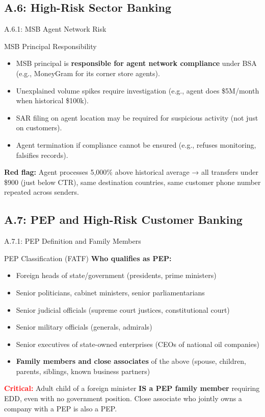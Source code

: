 \documentclass{beamer}
\begin{document}
	\subsection{A.6: High-Risk Sector Banking}
	
	\begin{frame}{A.6.1: MSB Agent Network Risk}
		\begin{block}{MSB Principal Responsibility}
			\begin{itemize}
				\item MSB principal is \textbf{responsible for agent network compliance} under BSA (e.g., MoneyGram for its corner store agents).
				\item Unexplained volume spikes require investigation (e.g., agent does \$5M/month when historical \$100k).
				\item SAR filing on agent location may be required for suspicious activity (not just on customers).
				\item Agent termination if compliance cannot be ensured (e.g., refuses monitoring, falsifies records).
			\end{itemize}
		\end{block}
		\textbf{Red flag:} Agent processes 5,000\% above historical average → all transfers under \$900 (just below CTR), same destination countries, same customer phone number repeated across senders.
	\end{frame}
	
	\subsection{A.7: PEP and High-Risk Customer Banking}
	
	\begin{frame}{A.7.1: PEP Definition and Family Members}
		\begin{block}{PEP Classification (FATF)}
			\textbf{Who qualifies as PEP:}
			\begin{itemize}
				\item Foreign heads of state/government (presidents, prime ministers)
				\item Senior politicians, cabinet ministers, senior parliamentarians
				\item Senior judicial officials (supreme court justices, constitutional court)
				\item Senior military officials (generals, admirals)
				\item Senior executives of state-owned enterprises (CEOs of national oil companies)
				\item \textbf{Family members and close associates} of the above (spouse, children, parents, siblings, known business partners)
			\end{itemize}
		\end{block}
		\textcolor{red}{\textbf{Critical:}} Adult child of a foreign minister \textbf{IS a PEP family member} requiring EDD, even with no government position. Close associate who jointly owns a company with a PEP is also a PEP.
	\end{frame}
	
\end{document}
